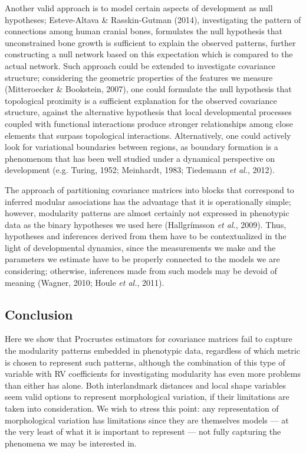 \documentclass[12pt,twoside]{report}
\begin{document}
Another valid approach is to model certain aspects of development as
null hypotheses; Esteve-Altava \& Rasskin-Gutman (2014), investigating
the pattern of connections among human cranial bones, formulates the
null hypothesis that unconstrained bone growth is sufficient to explain
the observed patterns, further constructing a null network based on this
expectation which is compared to the actual network. Such approach could
be extended to investigate covariance structure; considering the
geometric properties of the features we measure (Mitteroecker \&
Bookstein, 2007), one could formulate the null hypothesis that
topological proximity is a sufficient explanation for the observed
covariance structure, against the alternative hypothesis that local
developmental processes coupled with functional interactions produce
stronger relationships among close elements that surpass topological
interactions. Alternatively, one could actively look for variational
boundaries between regions, as boundary formation is a phenomenom that
has been well studied under a dynamical perspective on development (e.g.
Turing, 1952; Meinhardt, 1983; Tiedemann \emph{et al.}, 2012).

The approach of partitioning covariance matrices into blocks that
correspond to inferred modular associations has the advantage that it is
operationally simple; however, modularity patterns are almost certainly
not expressed in phenotypic data as the binary hypotheses we used here
(Hallgrímsson \emph{et al.}, 2009). Thus, hypotheses and inferences
derived from them have to be contextualized in the light of
developmental dynamics, since the measurements we make and the
parameters we estimate have to be properly connected to the models we
are considering; otherwise, inferences made from such models may be
devoid of meaning (Wagner, 2010; Houle \emph{et al.}, 2011).

\subsection{Conclusion}\label{conclusion}

Here we show that Procrustes estimators for covariance matrices fail to
capture the modularity patterns embedded in phenotypic data, regardless
of which metric is chosen to represent such patterns, although the
combination of this type of variable with RV coefficients for
investigating modularity has even more problems than either has alone.
Both interlandmark distances and local shape variables seem valid
options to represent morphological variation, if their limitations are
taken into consideration. We wish to stress this point: any
representation of morphological variation has limitations since they are
themselves models --- at the very least of what it is important to
represent --- not fully capturing the phenomena we may be interested in.
\end{document}
